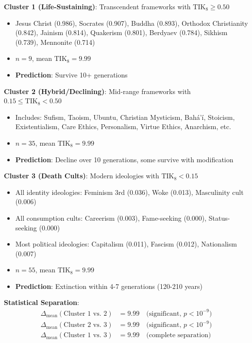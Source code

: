 \documentclass[11pt,a4paper]{article}
\theoremstyle{definition}
\theoremstyle{remark}
\newcommand{\TIKeight}{\text{TIK}_8}
\begin{document}
\textbf{Cluster 1 (Life-Sustaining)}: Transcendent frameworks with $\TIKeight \geq 0.50$
\begin{itemize}
    \item Jesus Christ (0.986), Socrates (0.907), Buddha (0.893), Orthodox Christianity (0.842), Jainism (0.814), Quakerism (0.801), Berdyaev (0.784), Sikhism (0.739), Mennonite (0.714)
    \item $n = 9$, mean $\TIKeight = 9.99$
    \item \textbf{Prediction}: Survive 10+ generations
\end{itemize}

\textbf{Cluster 2 (Hybrid/Declining)}: Mid-range frameworks with $0.15 \leq \TIKeight < 0.50$
\begin{itemize}
    \item Includes: Sufism, Taoism, Ubuntu, Christian Mysticism, Bahá'í, Stoicism, Existentialism, Care Ethics, Personalism, Virtue Ethics, Anarchism, etc.
    \item $n = 35$, mean $\TIKeight = 9.99$
    \item \textbf{Prediction}: Decline over 10 generations, some survive with modification
\end{itemize}

\textbf{Cluster 3 (Death Cults)}: Modern ideologies with $\TIKeight < 0.15$
\begin{itemize}
    \item All identity ideologies: Feminism 3rd (0.036), Woke (0.013), Masculinity cult (0.006)
    \item All consumption cults: Careerism (0.003), Fame-seeking (0.000), Status-seeking (0.000)
    \item Most political ideologies: Capitalism (0.011), Fascism (0.012), Nationalism (0.007)
    \item $n = 55$, mean $\TIKeight = 9.99$
    \item \textbf{Prediction}: Extinction within 4-7 generations (120-210 years)
\end{itemize}

\textbf{Statistical Separation}:
\begin{align}
    \Delta_{\text{mean}}(\text{Cluster 1 vs. 2}) &= 9.99 \quad \text{(significant, } p < 10^{-9}\text{)} \\
    \Delta_{\text{mean}}(\text{Cluster 2 vs. 3}) &= 9.99 \quad \text{(significant, } p < 10^{-9}\text{)} \\
    \Delta_{\text{mean}}(\text{Cluster 1 vs. 3}) &= 9.99 \quad \text{(complete separation)}
\end{align}
\end{document}
